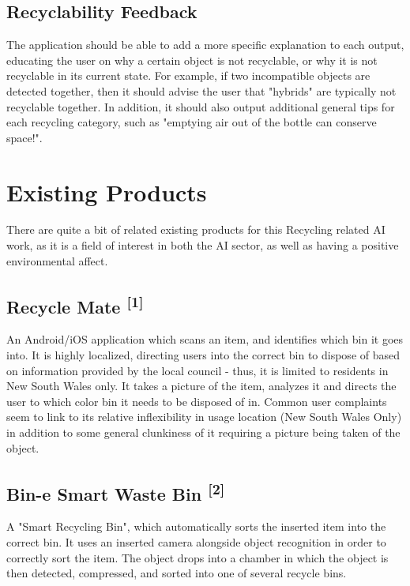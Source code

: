 \documentclass[conference]{IEEEtran}
\begin{document}
\subsection{Recyclability Feedback}

The application should be able to add a more specific explanation to each output, educating the user on why a certain object is not recyclable, or why it is not recyclable in its current state. For example, if two incompatible objects are detected together, then it should advise the user that "hybrids" are typically not recyclable together.
\newline
In addition, it should also output additional general tips for each recycling category, such as "emptying air out of the bottle can conserve space!".

\section{Existing Products}

There are quite a bit of related existing products for this Recycling related AI work, as it is a field of interest in both the AI sector, as well as having a positive environmental affect.

\subsection{Recycle Mate \textsuperscript{[1]}}

An Android/iOS application which scans an item, and identifies which bin it goes into. It is highly localized, directing users into the correct bin to dispose of based on information provided by the local council - thus, it is limited to residents in New South Wales only. It takes a picture of the item, analyzes it and directs the user to which color bin it needs to be disposed of in.
\newline
Common user complaints seem to link to its relative inflexibility in usage location (New South Wales Only) in addition to some general clunkiness of it requiring a picture being taken of the object.

\subsection{Bin-e Smart Waste Bin \textsuperscript{[2]}}

A "Smart Recycling Bin", which automatically sorts the inserted item into the correct bin. It uses an inserted camera alongside object recognition in order to correctly sort the item.
\newline
The object drops into a chamber in which the object is then detected, compressed, and sorted into one of several recycle bins. 
\end{document}
